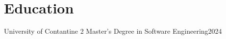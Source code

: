 \section{\textbf{Education}}
\resumeSubHeadingListStart
\resumeSubheading
{University of Contantine 2}{}
{Master's Degree in Software Engineering}{2024}
\resumeSubHeadingListEnd
%
